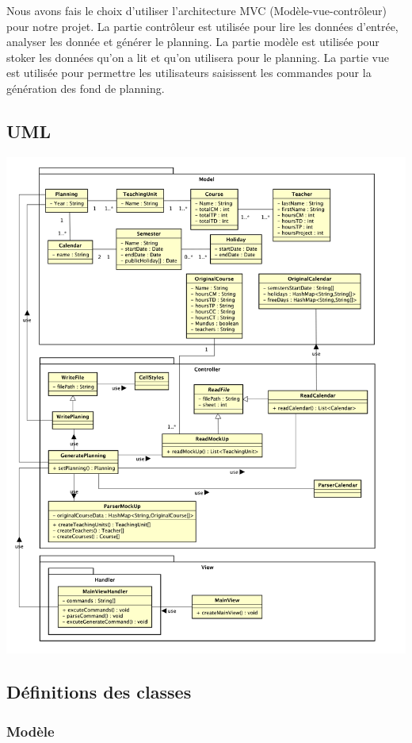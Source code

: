 \documentclass{polytech/polytech}
\begin{document}
	Nous avons fais le choix d'utiliser l'architecture MVC (Modèle-vue-contrôleur) pour notre projet.
	La partie contrôleur est utilisée pour lire les données d'entrée, analyser les donnée et générer le planning.
	La partie modèle est utilisée pour stoker les données qu'on a lit et qu'on utilisera pour le planning.
	La partie vue est utilisée pour permettre les utilisateurs saisissent les commandes pour la génération des fond de planning.

	\subsection{UML}
	\includegraphics[width=\textwidth]{./img/Diagram.png}

	\subsection{Définitions des classes}
	\subsubsection{Modèle}
\end{document}
